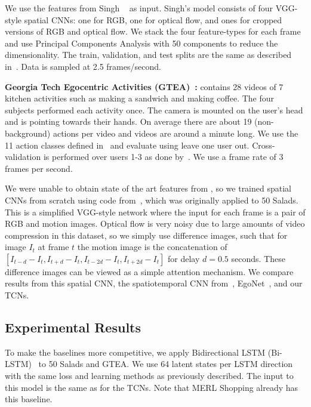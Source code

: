 \documentclass[10pt,twocolumn,letterpaper]{article}
\newcommand{\fakesubsection}[1]{\smallskip\noindent\textbf{#1:}}
\begin{document}
We use the features from Singh \etal~\cite{singh_cvpr_2016_merl} as input. Singh's model consists of four VGG-style spatial CNNs: one for RGB, one for optical flow, and ones for cropped versions of RGB and optical flow. We stack the four feature-types for each frame and use Principal Components Analysis with 50 components to reduce the dimensionality.
The train, validation, and test splits are the same as described in~\cite{singh_cvpr_2016_merl}.
Data is sampled at 2.5 frames/second.

\fakesubsection{Georgia Tech Egocentric Activities (GTEA)~\cite{fathi_cvpr_2011}}
contains 28 videos of 7 kitchen activities such as making a sandwich and making coffee. The four subjects performed each activity once.
The camera is mounted on the user's head and is pointing towards their hands.
On average there are about 19 (non-background) actions per video and videos are around a minute long. We use the 11 action classes defined in~\cite{fathi_iccv_2011} and evaluate using leave one user out. Cross-validation is performed over users 1-3 as done by~\cite{singh_cvpr_2016_ego}. 
We use a frame rate of 3 frames per second.


We were unable to obtain state of the art features from \cite{singh_cvpr_2016_ego}, so 
we trained spatial CNNs from scratch using code from~\cite{lea_eccv_2016}, which was originally applied to 50 Salads. 
This is a simplified VGG-style network where the input for each frame is a pair of RGB and motion images. 
Optical flow is very noisy due to large amounts of video compression in this dataset, so we simply use difference images, such that for image $I_t$ at frame $t$ the motion image is the concatenation of $[I_{t-d}-I_t, I_{t+d}-I_t, I_{t-2d}-I_t, I_{t+2d}-I_t]$ for delay $d=0.5$ seconds. 
These difference images can be viewed as a simple attention mechanism.
We compare results from this spatial CNN, the spatiotemporal CNN from~\cite{lea_eccv_2016}, EgoNet~\cite{singh_cvpr_2016_ego}, and our TCNs. 

\subsection{Experimental Results}
\label{sec:experiments}

To make the baselines more competitive, we apply Bidirectional LSTM (Bi-LSTM)~\cite{bi_lstm} to 50 Salads and GTEA. We use 64 latent states per LSTM direction with the same loss and learning methods as previously described. The input to this model is the same as for the TCNs. Note that MERL Shopping already has this baseline. 
\end{document}
